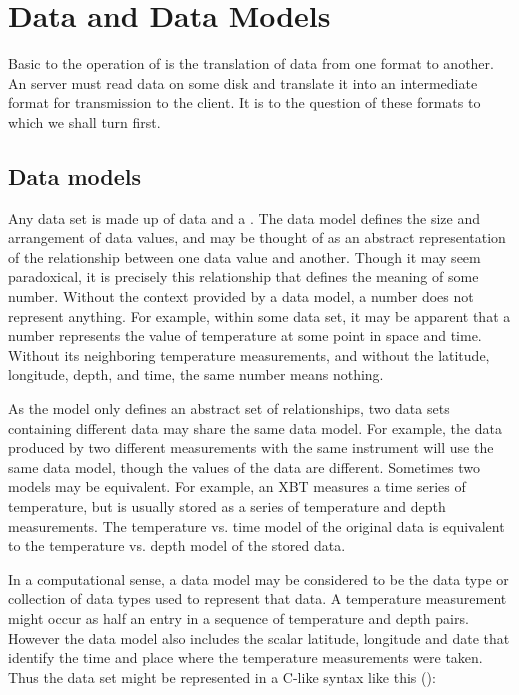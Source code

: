 %
%

\chapter{Data and Data Models}
\label{data}

Basic to the operation of \opendap is the translation of data from one
format to another. An \opendap server must read data on some disk and
translate it into an intermediate format for transmission to the
client. It is to the question of these formats to which we shall turn
first.

\section{Data models}
\label{data,model}
 

Any data set is made up of data and a . The data model
defines the size and arrangement of data values, and may be thought of
as an abstract representation of the relationship between one data
value and another. Though it may seem paradoxical, it is precisely
this relationship that defines the meaning of some number. Without the
context provided by a data model, a number does not represent
anything. For example, within some data set, it may be apparent that a
number represents the value of temperature at some point in space and
time. Without its neighboring temperature measurements, and without
the latitude, longitude, depth, and time, the same number means
nothing.

As the model only defines an abstract set of relationships, two data
sets containing different data may share the same data model. For
example, the data produced by two different measurements with the same
instrument will use the same data model, though the values of the data
are different. Sometimes two models may be equivalent.  For example,
an XBT measures a time series of temperature, but is usually stored as
a series of temperature and depth measurements.  The temperature vs.
time model of the original data is equivalent to the temperature vs.
depth model of the stored data.

In a computational sense, a data model may be considered to be the
data type or collection of data types used to represent that data. A
temperature measurement might occur as half an entry in a sequence of
temperature and depth pairs. However the data model also includes the
scalar latitude, longitude and date that identify the time and place
where the temperature measurements were taken. Thus the data set might
be represented in a C-like syntax like this ():

